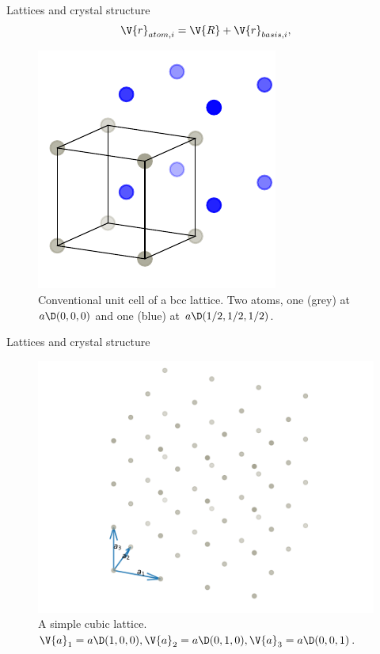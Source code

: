 \documentclass{beamer}
\begin{document}
\begin{frame}{Lattices and crystal structure}
\pause
\begin{equation*}
	\V{r}_{atom,i} = \V{R} + \V{r}_{basis, i},
\end{equation*}
\pause
\begin{figure}[H]
	\centering
	\includegraphics{figures/lattice_unfinished_1.pdf}
	\caption{Conventional unit cell of a bcc lattice. Two atoms, one (grey) at $ a \D (0,0,0) $ and one (blue) at $ a\D(1/2, 1/2, 1/2) $.}
\end{figure}
\end{frame}

\begin{frame}{Lattices and crystal structure}
\begin{figure}[H]
	\centering
	\includegraphics[width=.7\linewidth]{figures/cubic_no_grid.pdf}
	\caption{A simple cubic lattice. $ \V{a}_1 = a\D (1,0,0), \V{a}_2 = a\D(0,1,0), \V{a}_3 = a\D (0,0,1) $.}
	\label{fig:cubic_no_grid}
\end{figure}
\end{frame}
\end{document}
